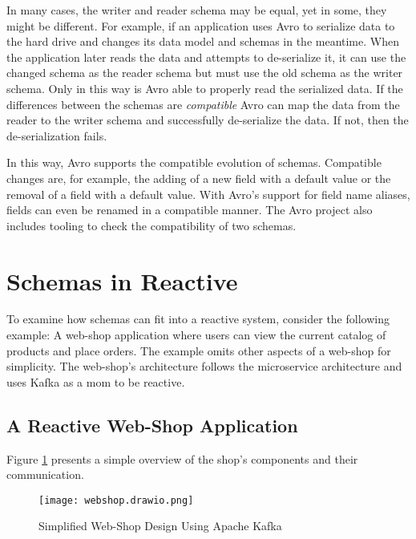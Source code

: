 In many cases, the writer and reader schema may be equal, yet in some, they might be different.
For example, if an application uses Avro to serialize data to the hard drive and changes its data model and schemas in the meantime.
When the application later reads the data and attempts to de-serialize it, it can use the changed schema as the reader schema but must use the old schema as the writer schema.
Only in this way is Avro able to properly read the serialized data.
If the differences between the schemas are \emph{compatible} Avro can map the data from the reader to the writer schema and successfully de-serialize the data.
If not, then the de-serialization fails.
\parencite{avro}

In this way, Avro supports the compatible evolution of schemas.
Compatible changes are, for example, the adding of a new field with a default value or the removal of a field with a default value.
With Avro's support for field name aliases, fields can even be renamed in a compatible manner.
The Avro project also includes tooling to check the compatibility of two schemas.
\parencite{avro}


\section{Schemas in Reactive }

To examine how schemas can fit into a reactive system, consider the following example:
A web-shop application where users can view the current catalog of products and place orders.
The example omits other aspects of a web-shop for simplicity.
The web-shop's architecture follows the microservice architecture and uses Kafka as a \gls{mom} to be reactive.

\subsection{A Reactive Web-Shop Application}

Figure \ref{fig:web-shop} presents a simple overview of the shop's components and their communication.

\begin{figure}[H]
  \centering
  \texttt{[image: webshop.drawio.png]}
  \caption{Simplified Web-Shop Design Using Apache Kafka}\label{fig:web-shop}
\end{figure}

